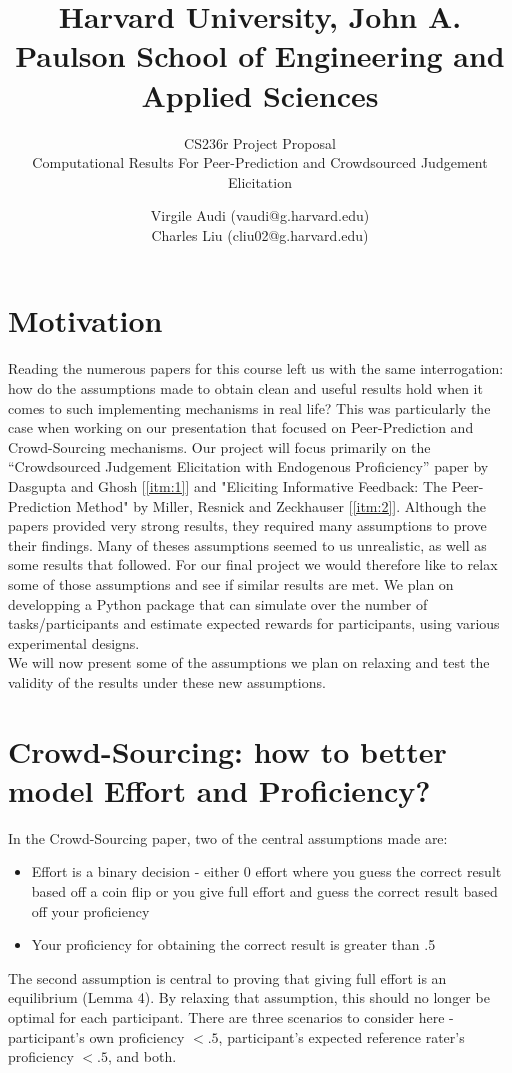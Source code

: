 \documentclass{scrartcl}
\title{Harvard University, John A. Paulson School of Engineering and Applied Sciences \newline}
\subtitle{CS236r Project Proposal\\ Computational Results For Peer-Prediction and Crowdsourced Judgement Elicitation}
\author{Virgile Audi (vaudi@g.harvard.edu)\\
		Charles Liu (cliu02@g.harvard.edu)}
\begin{document}
 
\maketitle
	  
\section{Motivation}

Reading the numerous papers for this course left us with the same interrogation: how do the assumptions made to obtain clean and useful results hold when it comes to such implementing  mechanisms in real life? This was particularly the case when working on our presentation that focused on Peer-Prediction and Crowd-Sourcing mechanisms. Our project will focus primarily on the ``Crowdsourced Judgement Elicitation with Endogenous Proficiency'' paper by Dasgupta and Ghosh [\ref{itm:1}] and "Eliciting Informative Feedback: The Peer-Prediction Method" by Miller, Resnick and Zeckhauser [\ref{itm:2}]. Although the papers provided very strong results, they required many assumptions to prove their findings. Many of theses assumptions seemed to us unrealistic, as well as some results that followed. For our final project we would therefore like to relax some of those assumptions and see if similar results are met. We plan on developping a Python package that can simulate over the number of tasks/participants and estimate expected rewards for participants, using various experimental designs.\\

\noindent We will now present some of the assumptions we plan on relaxing and test the validity of the results under these new assumptions.


\section{Crowd-Sourcing: how to better model Effort and Proficiency?}
In the Crowd-Sourcing paper, two of the central assumptions made are:
\begin{itemize}
	\item Effort is a binary decision - either 0 effort where you guess the correct result based off a coin flip or you give full effort and guess the correct result based off your proficiency
	\item Your proficiency for obtaining the correct result is greater than .5
\end{itemize}

The second assumption is central to proving that giving full effort is an equilibrium (Lemma 4). By relaxing that assumption, this should no longer be optimal for each participant. There are three scenarios to consider here - participant's own proficiency $<.5$, participant's expected reference rater's proficiency $<.5$, and both.
\end{document}
